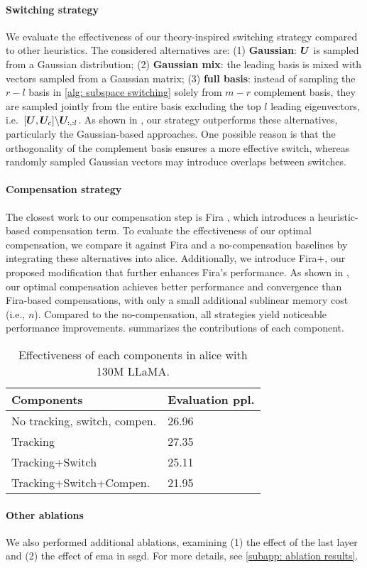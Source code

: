 \paragraph{Switching strategy}
We evaluate the effectiveness of our theory-inspired switching strategy compared to other heuristics. The considered alternatives are: (1) \textbf{Gaussian}: ${\bm{U}}$ is sampled from a Gaussian distribution; (2) \textbf{Gaussian mix}: the leading basis is mixed with vectors sampled from a Gaussian matrix; (3) \textbf{full basis}: instead of sampling the $r-l$ basis in \cref{alg: subspace switching} solely from $m-r$ complement basis, they are sampled jointly from the entire basis excluding the top $l$ leading eigenvectors, i.e.~$[{\bm{U}},{\bm{U}}_c]\backslash {{\bm{U}}_{:,:l}}$. As shown in , our strategy outperforms these alternatives, particularly the Gaussian-based approaches. One possible reason is that the orthogonality of the complement basis ensures a more effective switch, whereas randomly sampled Gaussian vectors may introduce overlaps between switches.

\paragraph{Compensation strategy}
The closest work to our compensation step is Fira \citep{chen2024fira}, which introduces a heuristic-based compensation term. To evaluate the effectiveness of our optimal compensation, we compare it against Fira and a no-compensation baselines by integrating these alternatives into \gls{alice}. Additionally, we introduce Fira+, our proposed modification that further enhances Fira’s performance. 
As shown in , our optimal compensation achieves better performance and convergence than Fira-based compensations, with only a small additional sublinear memory cost (i.e., $n$). Compared to the no-compensation, all strategies yield noticeable performance improvements.  summarizes the contributions of each component.

\begin{table}[]
\centering
\caption{Effectiveness of each components in \gls{alice} with 130M LLaMA.}
\label{tab: effectiveness of each component in alice}
\begin{tabular}{l|l}
\hline
      Components                       & Evaluation ppl. \\ \hline
No tracking, switch, compen. & 26.96           \\
Tracking                     & 27.35           \\
Tracking+Switch              & 25.11           \\
Tracking+Switch+Compen.      & 21.95           \\ \hline
\end{tabular}
\end{table}

\paragraph{Other ablations}
We also performed additional ablations, examining (1) the effect of the last layer and (2) the effect of \gls{ema} in \gls{ssgd}. For more details, see \cref{subapp: ablation results}.


